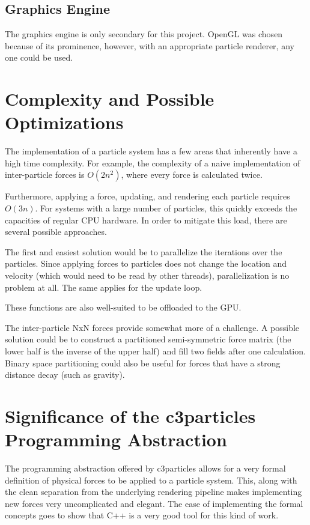 \documentclass[runningheads,a4paper]{llncs}
\begin{document}

\subsection{Graphics Engine}
The graphics engine is only secondary for this project. OpenGL\cite{opengl} was chosen because of its prominence, however, with an appropriate particle renderer, any one could be used.

\section{Complexity and Possible Optimizations}
The implementation of a particle system has a few areas that inherently have a high time complexity. For example, the complexity of a naive implementation of inter-particle forces is $O(2n^2)$, where every force is calculated twice.

Furthermore, applying a force, updating, and rendering each particle requires $O(3n)$. For systems with a large number of particles, this quickly exceeds the capacities of regular CPU hardware. In order to mitigate this load, there are several possible approaches.

The first and easiest solution would be to parallelize the iterations over the particles. Since applying forces to particles does not change the location and velocity (which would need to be read by other threads), parallelization is no problem at all. The same applies for the update loop.

These functions are also well-suited to be offloaded to the GPU.

The inter-particle NxN forces provide somewhat more of a challenge. A possible solution could be to construct a partitioned semi-symmetric force matrix (the lower half is the inverse of the upper half) and fill two fields after one calculation. Binary space partitioning could also be useful for forces that have a strong distance decay (such as gravity).


\section{Significance of the c3particles Programming Abstraction}

The programming abstraction offered by c3particles allows for a very formal definition of physical forces to be applied to a particle system. This, along with the clean separation from the underlying rendering pipeline makes implementing new forces very uncomplicated and elegant. The ease of implementing the formal concepts goes to show that C++ is a very good tool for this kind of work.





\end{document}
